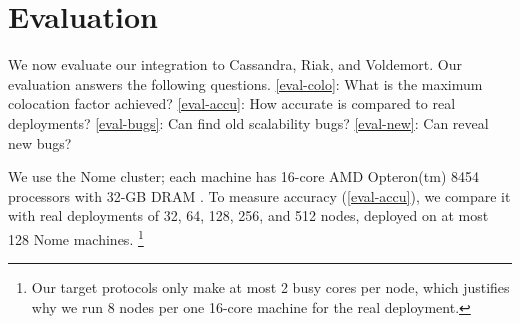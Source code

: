 

\section{Evaluation}
\label{sec-sck-eval}


We now evaluate our \sck integration to Cassandra, Riak,
and Voldemort.  Our evaluation answers the following questions.
%
\sec\ref{eval-colo}: What is the maximum colocation factor achieved?
%
\sec\ref{eval-accu}: How accurate is \sck compared to real deployments?
%
\sec\ref{eval-bugs}: Can \sck find old scalability bugs?
%
\sec\ref{eval-new}: Can \sck reveal new bugs?
%
%


We use the Nome cluster; each machine has 16-core AMD Opteron(tm) 8454
processors with 32-GB DRAM \cite{NomeNodes}.
%
To measure \sck accuracy (\sec\ref{eval-accu}), we compare it with real
deployments of 32, 64, 128, 256, and 512 nodes, deployed on at most 128 Nome
machines.  
%
\footnote{Our target protocols only make at most 2 busy cores per
node, which justifies why we run 8 nodes per one 16-core machine for the real
deployment. }
%





%

